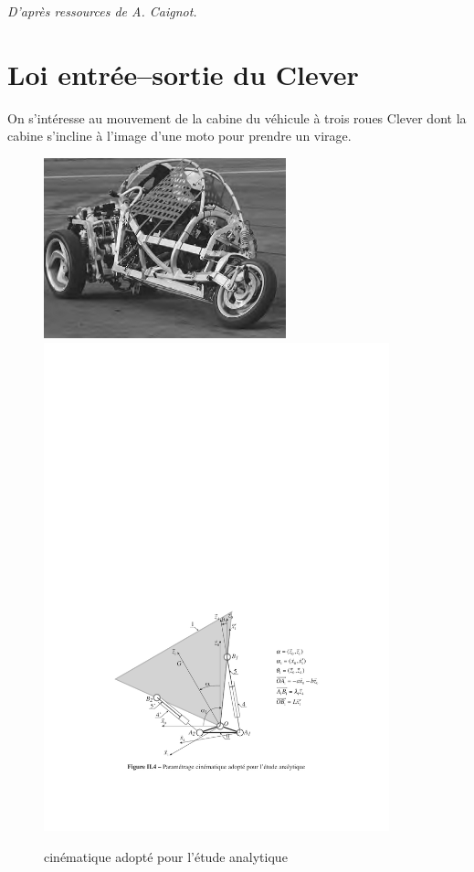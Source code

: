 \documentclass[10pt]{article}
\begin{document}




\begin{flushright}
 \textit{D'après ressources de A. Caignot.}
\end{flushright}

 \renewcommand{\baselinestretch}{1}
\setlength{\parskip}{0ex plus 0.5ex minus 0.2ex}



\section{Loi entrée--sortie du Clever}

On s'intéresse au mouvement de la cabine du véhicule à trois roues Clever dont la cabine s'incline à l'image d'une moto pour prendre un virage.

\begin{figure}[htbp]\centering
	\includegraphics[width=7cm]{images/clever4}\hfill
	\includegraphics[width=10cm]{images/figure5}
	\caption{cinématique adopté pour l'étude analytique\label{schema_cine_param}}
\end{figure}
\end{document}
